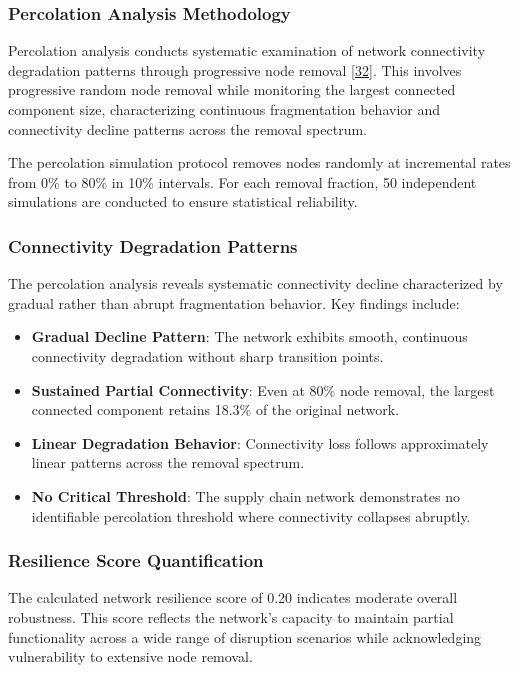 \documentclass[a4 paper, 11pt,twoside]{article}
\newcommand{\0}{\Bf{0}}
\theoremstyle{definition}
\begin{document}
\subsubsection{Percolation Analysis Methodology}

Percolation analysis conducts systematic examination of network connectivity degradation patterns through progressive node removal \hyperref[ref32]{[32]}. This involves progressive random node removal while monitoring the largest connected component size, characterizing continuous fragmentation behavior and connectivity decline patterns across the removal spectrum.

The percolation simulation protocol removes nodes randomly at incremental rates from 0\% to 80\% in 10\% intervals. For each removal fraction, 50 independent simulations are conducted to ensure statistical reliability.

\subsubsection{Connectivity Degradation Patterns}

The percolation analysis reveals systematic connectivity decline characterized by gradual rather than abrupt fragmentation behavior. Key findings include:

\begin{itemize}
\item \textbf{Gradual Decline Pattern}: The network exhibits smooth, continuous connectivity degradation without sharp transition points.
\item \textbf{Sustained Partial Connectivity}: Even at 80\% node removal, the largest connected component retains 18.3\% of the original network.
\item \textbf{Linear Degradation Behavior}: Connectivity loss follows approximately linear patterns across the removal spectrum.
\item \textbf{No Critical Threshold}: The supply chain network demonstrates no identifiable percolation threshold where connectivity collapses abruptly.
\end{itemize}

\subsubsection{Resilience Score Quantification}

The calculated network resilience score of 0.20 indicates moderate overall robustness. This score reflects the network's capacity to maintain partial functionality across a wide range of disruption scenarios while acknowledging vulnerability to extensive node removal.
\end{document}

